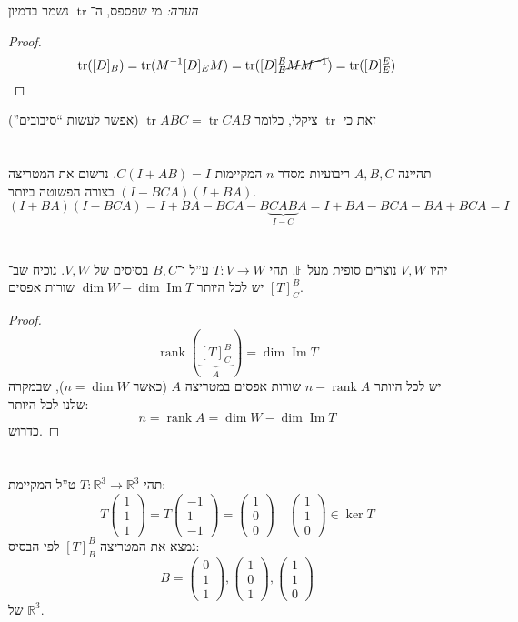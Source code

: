 \documentclass[]{article}
\newcommand\R     {\mathbb{R}}
\DeclareMathOperator\Img   {Im}
\DeclareMathOperator{\rk}     {rank}
\DeclareMathOperator{\tr}     {tr}
\newcommand\F         {\mathbb{F}}
\newcommand\co        {\colon}
\newcommand\pms[1]    {\begin{pmatrix}
		#1
\end{pmatrix}}
\newcommand\op    {^{-1}}
\theoremstyle{definition}
\begin{document}
	\textit{הערה: }מי שפספס, ה־$\tr$ נשמר בדמיון
	\begin{proof}
		\[ \tr([D]_B) = \tr(M\op[D]_EM) = \tr([D]^{E}_E \cancel{MM\op}) = \tr([D]^E_E) \]
	\end{proof}
	זאת כי $\tr$ ציקלי, כלומר $\tr ABC = \tr CAB$ (אפשר לעשות ``סיבובים'')
	
	\section{}
	תהיינה $A, B, C$ ריבועיות מסדר $n$ המקיימות $C(I + AB) = I$. נרשום את המטריצה $(I -  BCA)(I + BA)$ בצורה הפשוטה ביותר. 
	\[ (I + BA)(I -BCA) = I + BA - BCA - B\underbrace{CAB}_{I - C}A = I + BA - BCA - BA  + BCA = I \]
	
	
	\section{}
	יהיו $V, W$ נוצרים סופית מעל $\F$. תהי $T \co V \to W$ ע''ל ו־$B, C$ בסיסים של $V, W$. נוכיח שב־$[T]^{B}_C$ יש לכל היותר $\dim W - \dim \Img T$ שורות אפסים.
	
	\begin{proof}
		\[ \rk(\underbrace{[T]^{B}_C}_{A}) = \dim \Img T \]
		יש לכל היותר $n - \rk A$ שורות אפסים במטריצה $A$ (כאשר $n = \dim W$), שבמקרה שלנו לכל היותר: 
		\[ n = \rk A = \dim W - \dim \Img T \]
		כדרוש. 
	\end{proof}
	
	\section{}
	תהי $T \co \R^3 \to \R^3$ ט''ל המקיימת: 
	\[ T\pms{1 \\ 1 \\ 1} = T\pms{-1 \\ 1 \\ -1} = \pms{1 \\ 0 \\ 0} \quad \pms{1 \\ 1 \\ 0}\in \ker T  \]
	נמצא את המטריצה $[T]^{B}_B$ לפי הבסיס: 
	\[ B = \pms{ 0\\ 1 \\ 1}, \pms{1 \\ 0 \\ 1}, \pms{1 \\ 1 \\ 0} \]
	 של $\R^{3}$. 
	 
\end{document}
